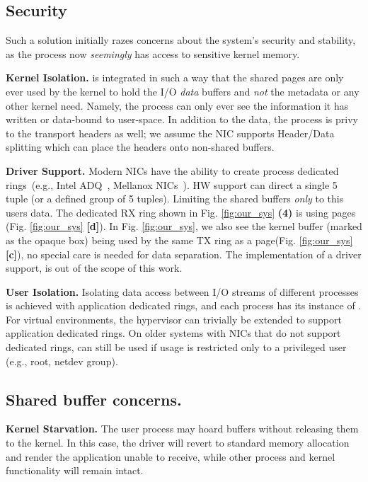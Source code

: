 \subsection{Security}
Such a solution initially razes concerns about the system's security and stability, as the process now \emph{seemingly} has access to sensitive kernel memory. 

\noindent\textbf{Kernel Isolation.} \oursys is integrated in such a way that the shared pages are only ever used by the kernel to hold the I/O \emph{data} buffers and \emph{not} the metadata or any other kernel need. Namely, the process can only ever see the information it has written or data-bound to user-space. In addition to the data, the process is privy to the transport headers as well; we assume the NIC supports Header/Data splitting\cite{hds} which can place the headers onto non-shared buffers.

\noindent\textbf{Driver Support.} Modern NICs have the ability to create process dedicated rings~(e.g., Intel ADQ~\cite{adq}, Mellanox NICs~\cite{bifurcate}). HW support\cite{flow_direct} can direct a single 5 tuple (or a defined group of 5 tuples). Limiting the shared buffers \emph{only} to this users data. The dedicated RX ring shown in Fig. \ref{fig:our_sys} \textbf{(4)} is using \oursys pages (Fig. \ref{fig:our_sys} \textbf{[d]}). In Fig. \ref{fig:our_sys}, we also see the kernel buffer (marked as the opaque box) being used by the same TX ring as a \oursys page(Fig. \ref{fig:our_sys} \textbf{[c]}), no special care is needed for data separation. The implementation of a driver support, is out of the scope of this work. 

\noindent\textbf{User Isolation.} Isolating data access between I/O streams of different processes is achieved with application dedicated rings, and each process has its instance of \oursys. For virtual environments, the hypervisor can trivially be extended to support application dedicated rings. On older systems with NICs that do not support dedicated rings, \oursys can still be used if usage is restricted only to a privileged user (e.g., root, netdev group).    

\subsection{Shared buffer concerns.}
\noindent\textbf{Kernel Starvation.} The user process may hoard \oursys buffers without releasing them to the kernel.
In this case, the driver will revert to standard memory allocation and render the application unable to receive, while other process and kernel functionality will remain intact.


